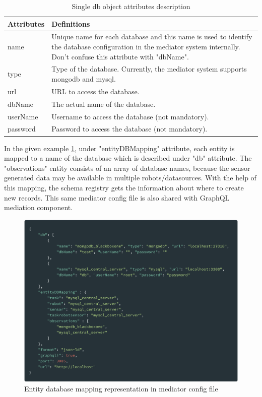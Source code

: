 	\begin{table}[h!]
		\begin{tabular}{|l|p{12cm}|}
			\hline
			\textbf{Attributes} & \textbf{Definitions} \\ \hline
			
			name & Unique name for each database and this name is used to identify the database configuration in the mediator system internally. Don't confuse this attribute with "dbName". \\ \hline
			type & Type of the database. Currently, the mediator system supports mongodb and mysql. \\ \hline
			url & URL to access the database. \\ \hline
			dbName & The actual name of the database. \\ \hline
			userName & Username to access the database (not mandatory). \\ \hline
			password & Password to access the database (not mandatory). \\ \hline
			
		\end{tabular}
		\caption{Single db object attributes description}
		\label{tab:db_attribute_desc}
	\end{table}
	
	
	In the given example \ref{fig:entity_db_mapping}, under "entityDBMapping" attribute, each entity is mapped to a name of the database which is described under "db" attribute. The "observations" entity consists of an array of database names, because the sensor generated data may be available in multiple robots/datasources. With the help of this mapping, the schema registry gets the information about where to create new records. This same mediator config file is also shared with GraphQL mediation component.
	
	\begin{figure}[!htbp] 
		\begin{center}
			\includegraphics[scale=0.1]{./images/png/implementation/entity_db_mapping}	
			\caption{Entity database mapping representation in mediator config file}	
			\label{fig:entity_db_mapping}	
		\end{center}
	\end{figure}

